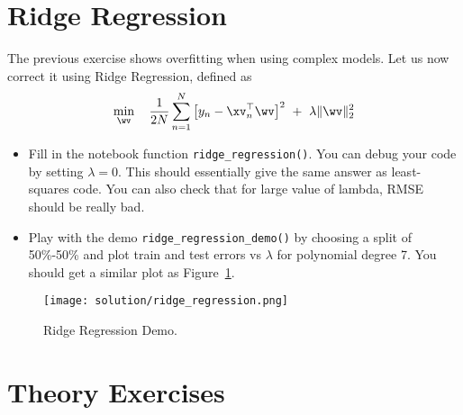 \documentclass{../tex_import/ETHuebung_english}
\begin{document}
\section{Ridge Regression}
The previous exercise shows overfitting when using complex models.
Let us now correct it using Ridge Regression, defined as
\[
\min_{\wv} \quad \frac{1}{2N} \sum_{n=1}^N \big[y_n - \xv_n^\top \wv \big]^2 \ + \ 
\lambda \|\wv\|_2^2
\]

\begin{itemize}
\item Fill in the notebook function {\tt ridge\_regression()}.
You can debug your code by setting $\lambda=0$.
This should essentially give the same answer as least-squares code.
You can also check that for large value of lambda, RMSE should be really bad.
\item Play with the demo {\tt ridge\_regression\_demo()}
by choosing a split of 50\%-50\% and plot train and test errors vs $\lambda$ for polynomial degree 7.
You should get a similar plot as Figure~\ref{fig:ridge_regression}.
\end{itemize}

\begin{figure}[!htp]
\centering
\texttt{[image: solution/ridge\_regression.png]}\vspace{-1em}
\caption{Ridge Regression Demo.}
\label{fig:ridge_regression}
\end{figure}


\newpage
\section*{Theory Exercises}
\end{document}
